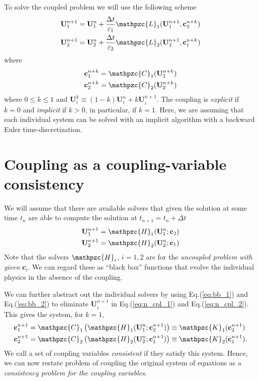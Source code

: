 \documentclass[11pt, reqno]{amsart}
\newcommand{\eqr}[1]{Eq.\thinspace(#1)}
\newcommand{\mvec}[1]{\mathbf{#1}}
\newcommand{\script}[1]{\mathpzc{#1}}
\theoremstyle{definition}
\begin{document}
To solve the coupled problem we will use the following scheme
\begin{align}
  \mvec{U}_1^{n+1} &= \mvec{U}_1^{n} + \frac{\Delta t}{\varepsilon_1}
  \script{L}_1(\mvec{U}_1^{n+1}, \mvec{c}_2^{n+k}) \\
  \mvec{U}_2^{n+1} &= \mvec{U}_2^{n} + \frac{\Delta t}{\varepsilon_2}
  \script{L}_2(\mvec{U}_2^{n+1}, \mvec{c}_1^{n+k})
\end{align}
where
\begin{align}
  \mvec{c}_1^{n+k} &= \script{C}_1(\mvec{U}_1^{n+k}) \label{eq:n_cpl_1} \\
  \mvec{c}_2^{n+k} &= \script{C}_2(\mvec{U}_2^{n+k}) \label{eq:n_cpl_2}
\end{align}
where $0 \le k \le 1$ and $\mvec{U}_i^k \equiv
(1-k)\mvec{U}_i^n+k\mvec{U}_i^{n+1}$. The coupling is \emph{explicit}
if $k=0$ and \emph{implicit} if $k>0$, in particular, if $k=1$. Here,
we are assuming that each individual system can be solved with an
implicit algorithm with a backward Euler time-discretization.

\section{Coupling as a coupling-variable consistency}

We will assume that there are available solvers that given the
solution at some time $t_n$ are able to compute the solution at
$t_{n+1} = t_n+\Delta t$
\begin{align}
  \mvec{U}_1^{n+1} &= \script{H}_1(\mvec{U}_1^n; \mvec{c}_2) \label{eq:bb_1} \\
  \mvec{U}_2^{n+1} &= \script{H}_2(\mvec{U}_2^n; \mvec{c}_1) \label{eq:bb_2}
\end{align}
Note that the solvers $\script{H}_i$, $i=1,2$ are for the
\emph{uncoupled problem with given} $\mvec{c}_i$. We can regard these
as ``black box'' functions that evolve the individual physics in the
absence of the coupling.

We can further abstract out the individual solvers by using
\eqr{\ref{eq:bb_1}} and \eqr{\ref{eq:bb_2}} to eliminate $\mvec{U}_i^{n+1}$
in \eqr{\ref{eq:n_cpl_1}} and \eqr{\ref{eq:n_cpl_2}}. This gives the
system, for $k=1$,
\begin{align}
  \mvec{c}_1^{n+1} &= 
  \script{C}_1\left(\script{H}_1(\mvec{U}_1^n;
    \mvec{c}_2^{n+1})\right)
  \equiv \script{K}_1(\mvec{c}_2^{n+1})
  \\
  \mvec{c}_2^{n+1} &= 
  \script{C}_2\left(\script{H}_2(\mvec{U}_2^n;
    \mvec{c}_1^{n+1})\right)
  \equiv \script{K}_2(\mvec{c}_1^{n+1}).
\end{align}
We call a set of coupling variables \emph{consistent} if they satisfy
this system. Hence, we can now restate problem of coupling the
original system of equations as a \emph{consistency problem for the
  coupling variables}.
\end{document}

